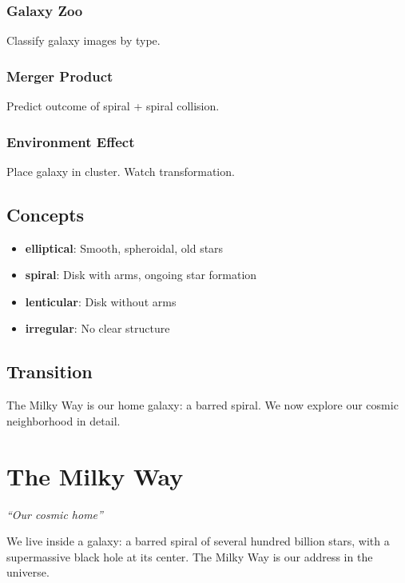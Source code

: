 \documentclass[
  11pt,
  letterpaper,
  twoside,
  openright]{book}
\providecommand{\tightlist}{%
  \setlength{\itemsep}{0pt}\setlength{\parskip}{0pt}}
\begin{document}
\subsection{Galaxy Zoo}\label{galaxy-zoo}

Classify galaxy images by type.

\subsection{Merger Product}\label{merger-product}

Predict outcome of spiral + spiral collision.

\subsection{Environment Effect}\label{environment-effect}

Place galaxy in cluster. Watch transformation.

\section{Concepts}\label{concepts-25}

\begin{itemize}
\tightlist
\item
  \textbf{elliptical}: Smooth, spheroidal, old stars
\item
  \textbf{spiral}: Disk with arms, ongoing star formation
\item
  \textbf{lenticular}: Disk without arms
\item
  \textbf{irregular}: No clear structure
\end{itemize}

\section{Transition}\label{transition-25}

The Milky Way is our home galaxy: a barred spiral. We now explore our
cosmic neighborhood in detail.

\chapter{The Milky Way}\label{sec-milky-way}

\emph{``Our cosmic home''}

\begin{tcolorbox}[enhanced jigsaw, leftrule=.75mm, title=\textcolor{quarto-callout-note-color}{\faInfo}\hspace{0.5em}{Key Revelation}, bottomrule=.15mm, opacityback=0, coltitle=black, arc=.35mm, colframe=quarto-callout-note-color-frame, colbacktitle=quarto-callout-note-color!10!white, colback=white, titlerule=0mm, breakable, bottomtitle=1mm, toptitle=1mm, rightrule=.15mm, toprule=.15mm, left=2mm, opacitybacktitle=0.6]

We live inside a galaxy: a barred spiral of several hundred billion
stars, with a supermassive black hole at its center. The Milky Way is
our address in the universe.

\end{tcolorbox}
\end{document}
